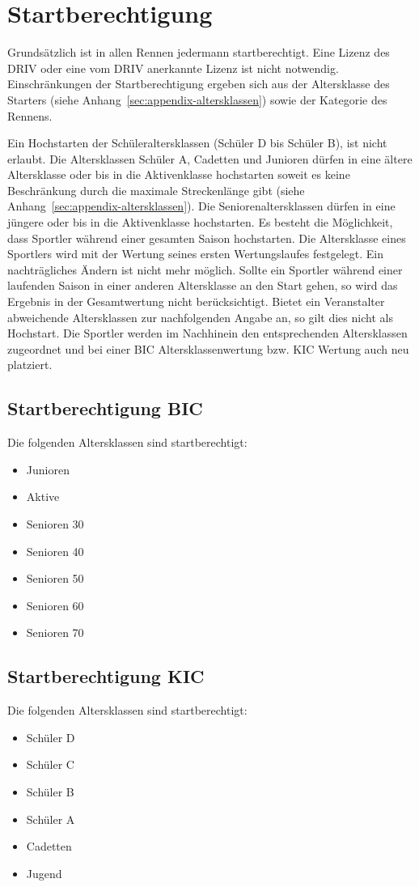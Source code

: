 \section{Startberechtigung}
Grundsätzlich ist in allen Rennen jedermann startberechtigt. Eine Lizenz des DRIV oder eine vom DRIV anerkannte Lizenz ist nicht notwendig. Einschränkungen der Startberechtigung ergeben sich aus der Altersklasse des Starters (siehe Anhang~\ref{sec:appendix-altersklassen}) sowie der Kategorie des Rennens.

Ein Hochstarten der Schüleraltersklassen (Schüler D bis Schüler B), ist nicht erlaubt. Die Altersklassen Schüler A, Cadetten und Junioren dürfen in eine ältere Altersklasse oder bis in die Aktivenklasse hochstarten soweit es keine Beschränkung durch die maximale Streckenlänge gibt (siehe Anhang~\ref{sec:appendix-altersklassen}). Die Seniorenaltersklassen dürfen in eine jüngere oder bis in die Aktivenklasse hochstarten.
Es besteht die Möglichkeit, dass Sportler während einer gesamten Saison hochstarten. Die Altersklasse eines Sportlers wird mit der Wertung seines ersten Wertungslaufes festgelegt. Ein nachträgliches Ändern ist nicht mehr möglich. Sollte ein Sportler während einer laufenden Saison in einer anderen Altersklasse an den Start gehen, so wird das Ergebnis in der Gesamtwertung nicht berücksichtigt. Bietet ein Veranstalter abweichende Altersklassen zur nachfolgenden Angabe an, so gilt dies nicht als Hochstart. Die Sportler werden im Nachhinein den entsprechenden Altersklassen zugeordnet und bei einer BIC Altersklassenwertung bzw. KIC Wertung auch neu platziert.

\subsection{Startberechtigung BIC}
Die folgenden Altersklassen sind startberechtigt:
\begin{itemize}
	\item Junioren
	\item Aktive
	\item Senioren 30
	\item Senioren 40
	\item Senioren 50
	\item Senioren 60
	\item Senioren 70
\end{itemize}

\subsection{Startberechtigung KIC}
Die folgenden Altersklassen sind startberechtigt:
\begin{itemize}
	\item Schüler D
	\item Schüler C
	\item Schüler B
	\item Schüler A
	\item Cadetten
	\item Jugend
\end{itemize}


